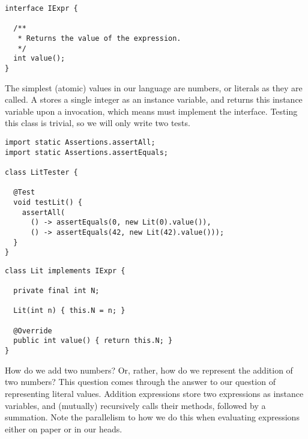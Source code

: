 
\begin{lstlisting}[language=MyJava]
interface IExpr {

  /**
   * Returns the value of the expression.
   */
  int value();
}
\end{lstlisting}

The simplest (atomic) values in our language are numbers, or literals as they are called. A  stores a single integer as an instance variable, and returns this instance variable upon a  invocation, which means  must implement the  interface. Testing this class is trivial, so we will only write two tests.

\begin{lstlisting}[language=MyJava]
import static Assertions.assertAll;
import static Assertions.assertEquals;

class LitTester {

  @Test
  void testLit() {
    assertAll(
      () -> assertEquals(0, new Lit(0).value()),      
      () -> assertEquals(42, new Lit(42).value()));
  }
}
\end{lstlisting}

\begin{lstlisting}[language=MyJava]
class Lit implements IExpr {

  private final int N;

  Lit(int n) { this.N = n; }

  @Override
  public int value() { return this.N; }
}
\end{lstlisting}

How do we add two numbers? Or, rather, how do we represent the addition of two numbers? This question comes through the answer to our question of representing literal values. Addition expressions store two  expressions as instance variables, and (mutually) recursively calls their  methods, followed by a summation. Note the parallelism to how we do this when evaluating expressions either on paper or in our heads.

